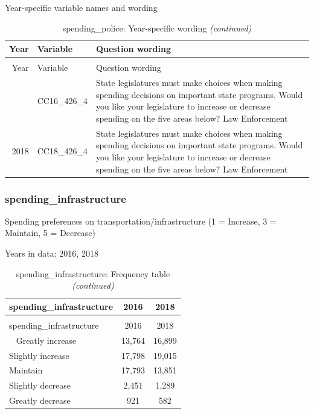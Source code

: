 \documentclass[12pt]{article}
\begin{document}
Year-specific variable names and wording

\begin{longtable}[t]{rl>{\raggedright\arraybackslash}p{10cm}}
\caption{\label{tab:unnamed-chunk-4}spending\_police: Year-specific wording}\\
\toprule
Year & Variable & Question wording\\
\midrule
\endfirsthead
\caption[]{spending\_police: Year-specific wording \textit{(continued)}}\\
\toprule
Year & Variable & Question wording\\
\midrule
\endhead
\
\endfoot
\bottomrule
\endlastfoot
2016 & CC16\_426\_4 & State legislatures must make choices when making spending decisions on important state programs. Would you like your legislature to increase or decrease spending on the five areas below? Law Enforcement\\
2018 & CC18\_426\_4 & State legislatures must make choices when making spending decisions on important state programs. Would you like your legislature to increase or decrease spending on the five areas below? Law Enforcement\\*
\end{longtable}

\subsubsection{spending\_infrastructure}\label{spending_infrastructure}

Spending preferences on transportation/infrastructure (1 = Increase, 3 =
Maintain, 5 = Decrease)

Years in data: 2016, 2018

\begin{longtable}[t]{lcc}
\caption{\label{tab:unnamed-chunk-4}spending\_infrastructure: Frequency table}\\
\toprule
spending\_infrastructure & 2016 & 2018\\
\midrule
\endfirsthead
\caption[]{spending\_infrastructure: Frequency table \textit{(continued)}}\\
\toprule
spending\_infrastructure & 2016 & 2018\\
\midrule
\endhead
\
\endfoot
\bottomrule
\endlastfoot
Greatly increase & 13,764 & 16,899\\
Slightly increase & 17,798 & 19,015\\
Maintain & 17,793 & 13,851\\
Slightly decrease & 2,451 & 1,289\\
Greatly decrease & 921 & 582\\*
\end{longtable}
\end{document}

